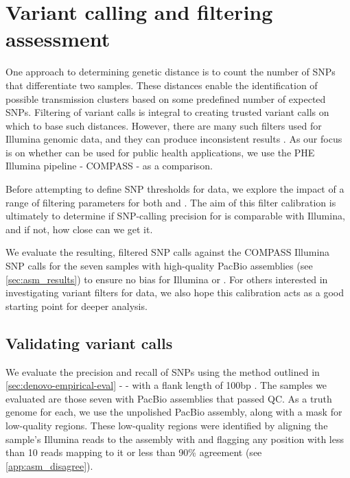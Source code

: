 
\section{Variant calling and filtering assessment}
\label{sec:var-calls}
One approach to determining genetic distance is to count the number of SNPs that differentiate two samples. These distances enable the identification of possible transmission clusters based on some predefined number of expected SNPs. Filtering of variant calls is integral to creating trusted variant calls on which to base such distances. However, there are many such filters used for Illumina genomic data, and they can produce inconsistent results \cite{walter2020}. As our focus is on whether \ont{} can be used for public health applications, we use the PHE Illumina pipeline - COMPASS \cite{Jajou2019} - as a comparison.

Before attempting to define SNP thresholds for \ont{} data, we explore the impact of a range of filtering parameters for both \bcftools{} and \pandora{}. The aim of this filter calibration is ultimately to determine if SNP-calling precision for \ont{} is comparable with Illumina, and if not, how close can we get it.

We evaluate the resulting, filtered SNP calls against the COMPASS Illumina SNP calls for the seven samples with high-quality PacBio assemblies (see \autoref{sec:asm_results}) to ensure no bias for Illumina or \ont{}. For others interested in investigating variant filters for \ont{} data, we also hope this calibration acts as a good starting point for deeper analysis.

\subsection{Validating variant calls}
\label{sec:validate-var-calls}

We evaluate the precision and recall of SNPs using the method outlined in \autoref{sec:denovo-empirical-eval} -  - with a flank length of 100bp \cite{minos}. The samples we evaluated are those seven with PacBio assemblies that passed QC. As a truth genome for each, we use the unpolished \flye{} PacBio assembly, along with a mask for low-quality regions. These low-quality regions were identified by aligning the sample's Illumina reads to the assembly with  and flagging any position with less than 10 reads mapping to it or less than 90\% agreement (see \autoref{app:asm_disagree}). 

